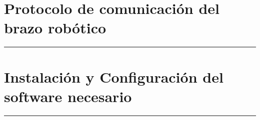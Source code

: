     \chapter{Protocolo de comunicación del brazo robótico} \label{app:comunicacion_brazo}
        \hrule
        \vspace{3mm}
        

     \chapter{Instalación y Configuración del software necesario} \label{app:instalacion_software}
         \hrule
         \vspace{3mm}
         


